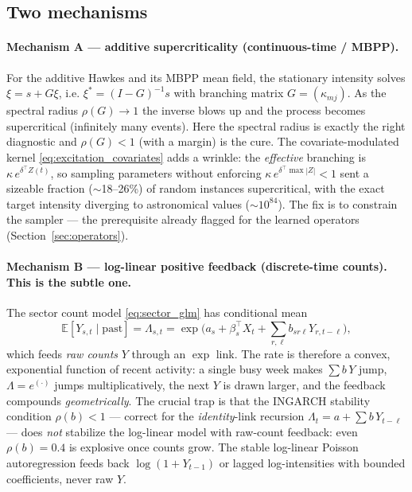 \documentclass[11pt]{article}
\theoremstyle{plain}
\theoremstyle{definition}
\theoremstyle{remark}
\newcommand{\E}{\mathbb{E}}
\begin{document}
\subsection{Two mechanisms}
\paragraph{Mechanism A --- additive supercriticality (continuous-time / MBPP).}
For the additive Hawkes and its MBPP mean field, the stationary intensity solves $\xi=s+G\xi$, i.e. $\xi^\ast=(I-G)^{-1}s$ with branching matrix $G=(\kappa_{mj})$. As the spectral radius $\rho(G)\to1$ the inverse blows up and the process becomes supercritical (infinitely many events). Here the spectral radius is exactly the right diagnostic and $\rho(G)<1$ (with a margin) is the cure. The covariate-modulated kernel \eqref{eq:excitation_covariates} adds a wrinkle: the \emph{effective} branching is $\kappa\,e^{\delta^\top Z(t)}$, so sampling parameters without enforcing $\kappa\,e^{\delta^\top\max|Z|}<1$ sent a sizeable fraction ($\sim$18--26\%) of random instances supercritical, with the exact target intensity diverging to astronomical values ($\sim10^{84}$). The fix is to constrain the sampler --- the prerequisite already flagged for the learned operators (Section~\ref{sec:operators}).

\paragraph{Mechanism B --- log-linear positive feedback (discrete-time counts). This is the subtle one.}
The sector count model \eqref{eq:sector_glm} has conditional mean
\begin{equation}
\E[Y_{s,t}\mid\text{past}]=\Lambda_{s,t}=\exp\!\Big(a_s+\beta_s^\top X_t+\textstyle\sum_{r,\ell}b_{sr\ell}Y_{r,t-\ell}\Big),
\label{eq:loglin_feedback}
\end{equation}
which feeds \emph{raw counts} $Y$ through an $\exp$ link. The rate is therefore a convex, exponential function of recent activity: a single busy week makes $\sum b\,Y$ jump, $\Lambda=e^{(\cdot)}$ jumps multiplicatively, the next $Y$ is drawn larger, and the feedback compounds \emph{geometrically}. The crucial trap is that the INGARCH stability condition $\rho(b)<1$ --- correct for the \emph{identity}-link recursion $\Lambda_t=a+\sum b\,Y_{t-\ell}$ --- does \emph{not} stabilize the log-linear model with raw-count feedback: even $\rho(b)=0.4$ is explosive once counts grow. The stable log-linear Poisson autoregression \citep{fokianos2009} feeds back $\log(1+Y_{t-1})$ or lagged log-intensities with bounded coefficients, never raw $Y$.
\end{document}
